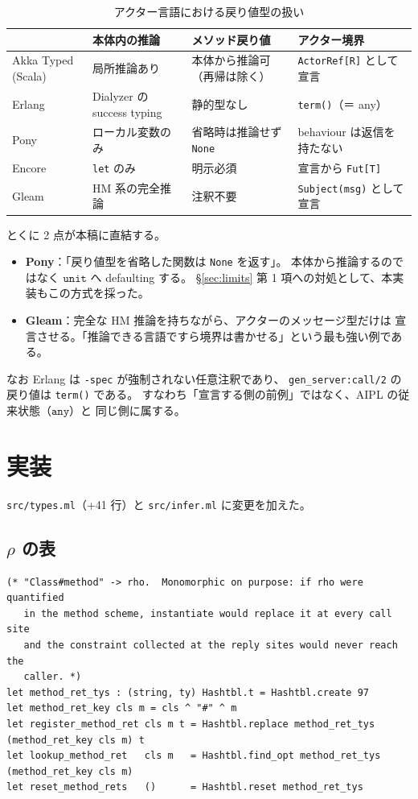 \documentclass[11pt,a4paper]{ltjsarticle}
\theoremstyle{definition}
\theoremstyle{remark}
\newcommand{\ty}[1]{\ensuremath{\mathtt{#1}}}
\begin{document}
\begin{table}[htbp]
\centering
\small
\begin{tabular}{@{}lp{3.4cm}p{3.5cm}p{4.0cm}@{}}
\toprule
 & 本体内の推論 & メソッド戻り値 & アクター境界 \\
\midrule
Akka Typed (Scala) & 局所推論あり & 本体から推論可（再帰は除く） & \texttt{ActorRef[R]} として宣言 \\
Erlang & Dialyzer の success typing & 静的型なし & \texttt{term()}（＝ any） \\
Pony & ローカル変数のみ & 省略時は推論せず \texttt{None} & behaviour は返信を持たない \\
Encore & \texttt{let} のみ & 明示必須 & 宣言から \texttt{Fut[T]} \\
Gleam & HM 系の完全推論 & 注釈不要 & \texttt{Subject(msg)} として宣言 \\
\bottomrule
\end{tabular}
\caption{アクター言語における戻り値型の扱い}
\label{tab:langs}
\end{table}

とくに 2 点が本稿に直結する。

\begin{itemize}
\item \textbf{Pony}：「戻り値型を省略した関数は \texttt{None} を返す」。
  本体から推論するのではなく \ty{unit} へ defaulting する。
  \S\ref{sec:limits} 第 1 項への対処として、本実装もこの方式を採った。
\item \textbf{Gleam}：完全な HM 推論を持ちながら、アクターのメッセージ型だけは
  宣言させる。「推論できる言語ですら境界は書かせる」という最も強い例である。
\end{itemize}

なお Erlang は \texttt{-spec} が強制されない任意注釈であり、
\texttt{gen\_server:call/2} の戻り値は \texttt{term()} である。
すなわち「宣言する側の前例」ではなく、AIPL の従来状態（\ty{any}）と
同じ側に属する。

\section{実装}

\texttt{src/types.ml}（+41 行）と \texttt{src/infer.ml} に変更を加えた。

\subsection{$\rho$ の表}

\begin{lstlisting}
(* "Class#method" -> rho.  Monomorphic on purpose: if rho were quantified
   in the method scheme, instantiate would replace it at every call site
   and the constraint collected at the reply sites would never reach the
   caller. *)
let method_ret_tys : (string, ty) Hashtbl.t = Hashtbl.create 97
let method_ret_key cls m = cls ^ "#" ^ m
let register_method_ret cls m t = Hashtbl.replace method_ret_tys (method_ret_key cls m) t
let lookup_method_ret   cls m   = Hashtbl.find_opt method_ret_tys (method_ret_key cls m)
let reset_method_rets   ()      = Hashtbl.reset method_ret_tys
\end{lstlisting}
\end{document}
